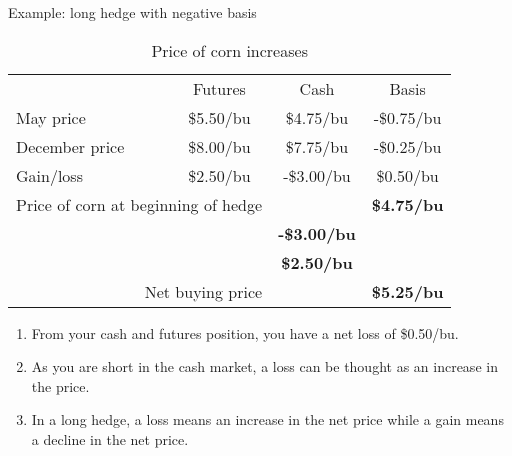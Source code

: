 \documentclass[table,xcolor=pdftex,dvipsnames]{beamer}\usepackage[]{graphicx}\usepackage[]{color}
\begin{document}
\begin{frame}{Example: long hedge with negative basis}
\begin{table}
\caption{Price of corn increases}
\scriptsize
\begin{tabular}{l c c c}
  \toprule
   & Futures & Cash & Basis \\
  \addlinespace[0.075in]
  May price & \$5.50/bu & \$4.75/bu & -\$0.75/bu \\
  \addlinespace[0.075in]
  December price & \$8.00/bu & \$7.75/bu  & -\$0.25/bu \\
  \cmidrule(r){2-4}
  Gain/loss & \$2.50/bu & -\$3.00/bu  & \$0.50/bu \\
  \midrule
  \multicolumn{2}{r}{Price of corn at beginning of hedge} & & \textbf{\$4.75/bu} \\
  \addlinespace[0.075in]
  \multicolumn{2}{r}{Gain/loss from cash position} & & \textbf{-\$3.00/bu} \\
  \addlinespace[0.075in]
  \multicolumn{2}{r}{Gain/loss from futures position} & & \textbf{\$2.50/bu} \\
  \cmidrule(r){4-4}
  \multicolumn{2}{r}{Net buying price} &  & \textbf{\$5.25/bu} \\
  \bottomrule
\end{tabular}
\end{table}
\begin{enumerate}[label=\textbullet]
    \item From your cash and futures position, you have a net loss of \$0.50/bu.
    \item As you are short in the cash market, a loss can be thought as an increase in the price.
    \item In a long hedge, a loss means an increase in the net price while a gain means a decline in the net price.
\end{enumerate}
\end{frame}

\end{document}
